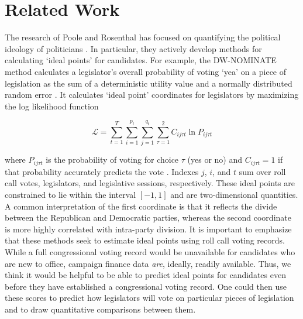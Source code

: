 \documentclass[12]{article}
\begin{document}
\section*{Related Work}

\noindent The research of Poole and Rosenthal has focused on quantifying the political ideology of politicians \cite{PR}. In particular, they actively develop methods for calculating `ideal points' for candidates. For example, the DW-NOMINATE method calculates a legislator's overall probability of voting `yea' on a piece of legislation as the sum of a deterministic utility value and a normally distributed random error \cite{NOMBOOT}. It calculates `ideal point' coordinates for legislators by maximizing the log likelihood function

\[ \mathcal{L} = \sum_{t=1}^{T} \sum_{i=1}^{p_t} \sum_{j=1}^{q_t} \sum_{\tau = 1}^{2} C_{ij \tau t} \ln P_{ij \tau t} \]

\noindent where $P_{ij \tau t}$ is the probability of voting for choice $\tau$ (yes or no) and $C_{ij \tau t} = 1$ if that probability accurately predicts the vote \cite{NOMBOOT}. Indexes $j$, $i$, and $t$ sum over roll call votes, legislators, and legislative sessions, respectively. These ideal points are constrained to lie within the interval $\left[ -1,1 \right]$ and are two-dimensional quantities. A common interpretation of the first coordinate is that it reflects the divide between the Republican and Democratic parties, whereas the second coordinate is more highly correlated with intra-party division. It is important to emphasize that these methods seek to estimate ideal points using roll call voting records. While a full congressional voting record would be unavailable for candidates who are new to office, campaign finance data \textit{are}, ideally, readily available. Thus, we think it would be helpful to be able to predict ideal points for candidates even before they have established a congressional voting record. One could then use these scores to predict how legislators will vote on particular pieces of legislation and to draw quantitative comparisons between them.\\
\end{document}
